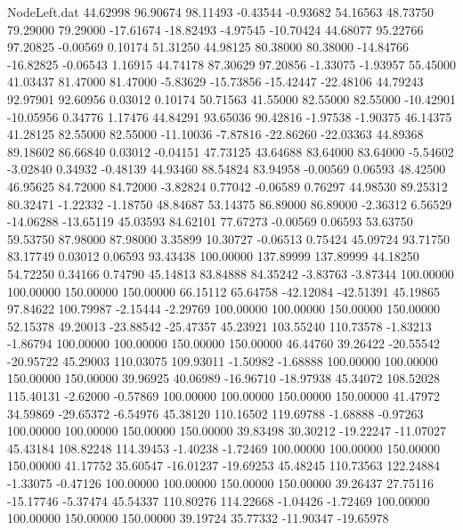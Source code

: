 \begin{filecontents}{NodeLeft.dat}
  44.62998   96.90674   98.11493    -0.43544   -0.93682   54.16563   48.73750   79.29000   79.29000  -17.61674  -18.82493   -4.97545  -10.70424
  44.68077   95.22766   97.20825    -0.00569    0.10174   51.31250   44.98125   80.38000   80.38000  -14.84766  -16.82825   -0.06543    1.16915
  44.74178   87.30629   97.20856    -1.33075   -1.93957   55.45000   41.03437   81.47000   81.47000   -5.83629  -15.73856  -15.42447  -22.48106
  44.79243   92.97901   92.60956     0.03012    0.10174   50.71563   41.55000   82.55000   82.55000  -10.42901  -10.05956    0.34776    1.17476
  44.84291   93.65036   90.42816    -1.97538   -1.90375   46.14375   41.28125   82.55000   82.55000  -11.10036   -7.87816  -22.86260  -22.03363
  44.89368   89.18602   86.66840     0.03012   -0.04151   47.73125   43.64688   83.64000   83.64000   -5.54602   -3.02840    0.34932   -0.48139
  44.93460   88.54824   83.94958    -0.00569    0.06593   48.42500   46.95625   84.72000   84.72000   -3.82824    0.77042   -0.06589    0.76297
  44.98530   89.25312   80.32471    -1.22332   -1.18750   48.84687   53.14375   86.89000   86.89000   -2.36312    6.56529  -14.06288  -13.65119
  45.03593   84.62101   77.67273    -0.00569    0.06593   53.63750   59.53750   87.98000   87.98000    3.35899   10.30727   -0.06513    0.75424
  45.09724   93.71750   83.17749     0.03012    0.06593   93.43438  100.00000  137.89999  137.89999   44.18250   54.72250    0.34166    0.74790
  45.14813   83.84888   84.35242    -3.83763   -3.87344  100.00000  100.00000  150.00000  150.00000   66.15112   65.64758  -42.12084  -42.51391
  45.19865   97.84622  100.79987    -2.15444   -2.29769  100.00000  100.00000  150.00000  150.00000   52.15378   49.20013  -23.88542  -25.47357
  45.23921  103.55240  110.73578    -1.83213   -1.86794  100.00000  100.00000  150.00000  150.00000   46.44760   39.26422  -20.55542  -20.95722
  45.29003  110.03075  109.93011    -1.50982   -1.68888  100.00000  100.00000  150.00000  150.00000   39.96925   40.06989  -16.96710  -18.97938
  45.34072  108.52028  115.40131    -2.62000   -0.57869  100.00000  100.00000  150.00000  150.00000   41.47972   34.59869  -29.65372   -6.54976
  45.38120  110.16502  119.69788    -1.68888   -0.97263  100.00000  100.00000  150.00000  150.00000   39.83498   30.30212  -19.22247  -11.07027
  45.43184  108.82248  114.39453    -1.40238   -1.72469  100.00000  100.00000  150.00000  150.00000   41.17752   35.60547  -16.01237  -19.69253
  45.48245  110.73563  122.24884    -1.33075   -0.47126  100.00000  100.00000  150.00000  150.00000   39.26437   27.75116  -15.17746   -5.37474
  45.54337  110.80276  114.22668    -1.04426   -1.72469  100.00000  100.00000  150.00000  150.00000   39.19724   35.77332  -11.90347  -19.65978

\end{filecontents}
